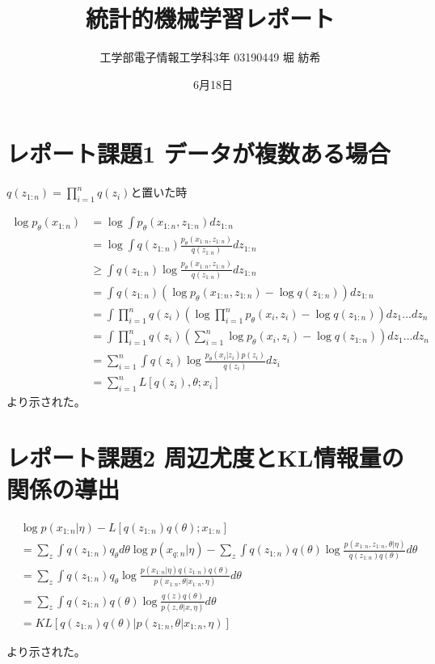 \documentclass[dvipdfmx]{jsarticle}
\begin{document}
\title{統計的機械学習レポート}
\author{工学部電子情報工学科3年 03190449  堀 紡希}
\date{\ 6月18日}
\maketitle

\section{レポート課題1 データが複数ある場合}


$q(z_{1:n}) = \prod_{i=1}^{n}q(z_{i})$と置いた時


\begin{align*}
\log{p_{\theta}(x_{1:n})}&=\log{\int p_{\theta}(x_{1:n}, z_{1:n})dz_{1:n}}\\
&=\log{\int q(z_{1:n})\frac{p_{\theta}(x_{1:n}, z_{1:n})}{q(z_{1:n})}dz_{1:n}}\\
&\geq \int q(z_{1:n})\log{\frac{p_{\theta}(x_{1:n}, z_{1:n})}{q(z_{1:n})}}dz_{1:n}\\
&=\int q(z_{1:n})(\log{p_{\theta}(x_{1:n}, z_{1:n})}-\log{q(z_{1:n})})dz_{1:n}\\
&=\int \prod^{n}_{i=1}q(z_{i})(\log{\prod^{n}_{i=1}p_{\theta}(x_{i}, z_{i})}-\log{q(z_{1:n})})dz_{1}\dots dz_{n}\\
&=\int \prod^{n}_{i=1}q(z_{i})(\sum^{n}_{i=1}\log{p_{\theta}(x_{i}, z_{i})}-\log{q(z_{1:n})})dz_{1}\dots dz_{n}\\
&=\sum^{n}_{i=1}\int q(z_{i})\log{\frac{p_{\theta}(x_{i}|z_{i})p(z_{i})}{q(z_{i})}}dz_{i}\\
&= \sum^{n}_{i=1}L[q(z_{i}), \theta;x_{i}]
\end{align*}
より示された。




\section{レポート課題2 周辺尤度とKL情報量の関係の導出}

\begin{align*}
&\log{p(x_{1:n}|\eta)}-L[q(z_{1:n})q(\theta);x_{1:n}]\\
&=\sum_{z}\int q(z_{1:n})q_{\theta}d\theta\log{p(x_{q:n}|\eta)}-\sum_{z}\int q(z_{1:n})q(\theta)\log{\frac{p(x_{1:n},z_{1:n}, \theta|\eta)}{q(z_{1:n})q(\theta)}}d\theta\\
&=\sum_{z}\int q(z_{1:n})q_{\theta}\log{\frac{p(x_{1:n}|\eta)q(z_{1:n})q(\theta)}{p(x_{1:n},\theta|x_{1:n}, \eta)}}d\theta\\
&=\sum_{z}\int q(z_{1:n})q(\theta)\log{\frac{q(z)q(\theta)}{p(z, \theta|x, \eta)}}d\theta\\
&=KL[q(z_{1:n})q(\theta)|p(z_{1:n}, \theta|x_{1:n}, \eta)]
\end{align*}


より示された。
\end{document}
